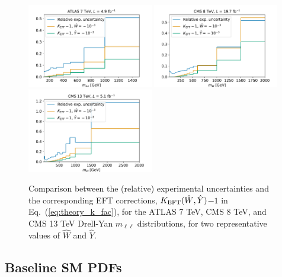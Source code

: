 \documentclass[withindex,glossary]{cam-thesis}
\begin{document}
\begin{figure}[t]
\centering
\includegraphics[width=0.49\textwidth]{dy_figures/atlas_7tev_kfacs.pdf}
\includegraphics[width=0.49\textwidth]{dy_figures/cms_8tev_kfacs.pdf}\\
\includegraphics[width=0.49\textwidth]{dy_figures/cms_13tev_kfacs.pdf}
\caption{\small Comparison between the (relative) experimental
  uncertainties and the corresponding EFT corrections,
$K_{\rm EFT}(\hat{W},\hat{Y})$$-$$1$ in Eq.~(\ref{eq:theory_k_fac}),
  for the ATLAS 7 TeV, CMS 8 TeV,
  and CMS 13 TeV Drell-Yan $m_{\ell\ell}$ distributions,
  for two representative values of  $\hat{W}$ and $\hat{Y}$.
  \label{fig:dysmeft}}
\end{figure}



\subsection{Baseline SM PDFs}
\label{sec:fitsettings}
\end{document}
